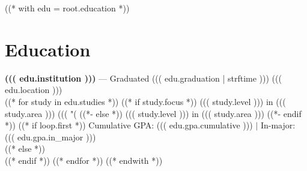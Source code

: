 ((* with edu = root.education *))
\section{Education}\relax
    {\large\textbf{((( edu.institution )))}} --- Graduated ((( edu.graduation | strftime ))) \hfill{\small ((( edu.location )))}\\
    ((* for study in edu.studies *))
            ((* if study.focus *))
    ((( study.level ))) in ((( study.area ))) ((( "(%
            ((*- else *))
    ((( study.level ))) in ((( study.area )))
            ((*- endif *))
            ((* if loop.first *))
 \hfill Cumulative GPA: ((( edu.gpa.cumulative ))) $|$ In-major: ((( edu.gpa.in_major )))\\
            ((* else *))
\\
            ((* endif *))
    ((* endfor *))
((* endwith *))
